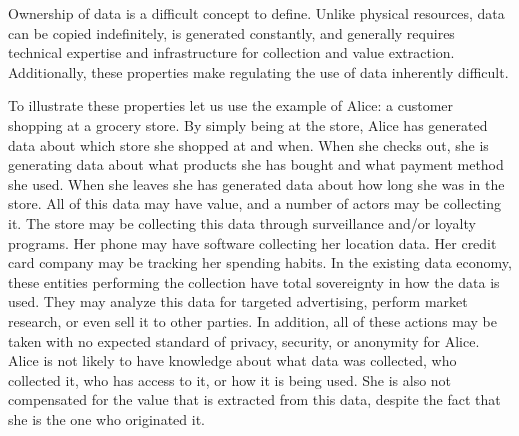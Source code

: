 
Ownership of data is a difficult concept to define. Unlike physical resources, data can be copied indefinitely, is generated constantly, and generally requires technical expertise and infrastructure for collection and value extraction. Additionally, these properties make regulating the use of data inherently difficult.

To illustrate these properties let us use the example of Alice: a customer shopping at a grocery store. By simply being at the store, Alice has generated data about which store she shopped at and when. When she checks out, she is generating data about what products she has bought and what payment method she used. When she leaves she has generated data about how long she was in the store. All of this data may have value, and a number of actors may be collecting it. The store may be collecting this data through surveillance and/or loyalty programs. Her phone may have software collecting her location data. Her credit card company may be tracking her spending habits. In the existing data economy, these entities performing the collection have total sovereignty in how the data is used. They may analyze this data for targeted advertising, perform market research, or even sell it to other parties. In addition, all of these actions may be taken with no expected standard of privacy, security, or anonymity for Alice. Alice is not likely to have knowledge about what data was collected, who collected it, who has access to it, or how it is being used. She is also not compensated for the value that is extracted from this data, despite the fact that she is the one who originated it.


